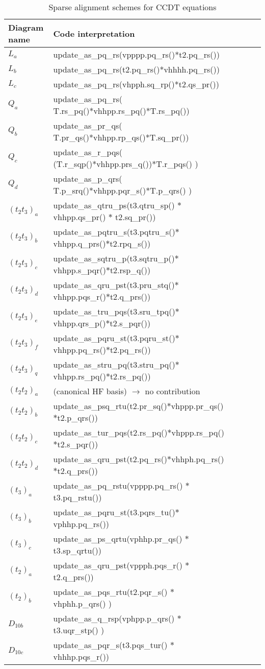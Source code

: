 \begin{table}[]
\centering
\caption{Sparse alignment schemes for CCDT equations}
\label{tab:diagram_code_interpretation}
\begin{tabular}{llllll}
Diagram name  &Code interpretation \\  \hline 
$L_a$   &  update\_as\_pq\_rs(vpppp.pq\_rs()*t2.pq\_rs()) \\
$L_b$   & update\_as\_pq\_rs(t2.pq\_rs()*vhhhh.pq\_rs()) \\
$L_c$   & update\_as\_pq\_rs(vhpph.sq\_rp()*t2.qs\_pr()) \\
$Q_a$   & update\_as\_pq\_rs( T.rs\_pq()*vhhpp.rs\_pq()*T.rs\_pq())\\
$Q_b$   &update\_as\_pr\_qs( T.pr\_qs()*vhhpp.rp\_qs()*T.sq\_pr())\\
$Q_c$   &update\_as\_r\_pqs( (T.r\_sqp()*vhhpp.prs\_q())*T.r\_pqs() )\\
$Q_d$   & update\_as\_p\_qrs( T.p\_srq()*vhhpp.pqr\_s()*T.p\_qrs() )\\
$(t_2 t_3)_a $&update\_as\_qtru\_ps(t3.qtru\_sp() $*$ vhhpp.qs\_pr() $*$ t2.sq\_pr()) \\
$(t_2 t_3)_b $&update\_as\_pqtru\_s(t3.pqtru\_s()$*$vhhpp.q\_prs()$*$t2.rpq\_s()) \\
$(t_2 t_3)_c $&update\_as\_sqtru\_p(t3.sqtru\_p()$*$vhhpp.s\_pqr()$*$t2.rsp\_q())\\
$(t_2 t_3)_d $&update\_as\_qru\_pst(t3.pru\_stq()$*$vhhpp.pqs\_r()$*$t2.q\_prs()) \\
$(t_2 t_3)_e $&update\_as\_tru\_pqs(t3.sru\_tpq()$*$vhhpp.qrs\_p()$*$t2.s\_pqr()) \\
$(t_2 t_3)_f $&update\_as\_pqru\_st(t3.pqru\_st()$*$vhhpp.pq\_rs()$*$t2.pq\_rs()) \\
$(t_2 t_3)_q $&update\_as\_stru\_pq(t3.stru\_pq()$*$vhhpp.rs\_pq()$*$t2.rs\_pq()) \\ \hline
$(t_2 t_2)_a$ & (canonical HF basis) $\rightarrow$ no contribution \\
$(t_2 t_2)_b$&update\_as\_psq\_rtu(t2.pr\_sq()$*$vhppp.pr\_qs()$*$t2.p\_qrs()) \\
$(t_2 t_2)_c$&update\_as\_tur\_pqs(t2.rs\_pq()$*$vhppp.rs\_pq()$*$t2.s\_pqr()) \\
$(t_2 t_2)_d$&update\_as\_qru\_pst(t2.pq\_rs()$*$vhhph.pq\_rs()$*$t2.q\_prs()) \\ \hline
$(t_3)_a$ &update\_as\_pq\_rstu(vpppp.pq\_rs() $*$ t3.pq\_rstu()) \\
$(t_3)_b$&update\_as\_pqru\_st(t3.pqrs\_tu()$*$ vphhp.pq\_rs()) \\
$(t_3)_c$&update\_as\_ps\_qrtu(vphhp.pr\_qs() $*$ t3.sp\_qrtu()) \\ \hline
$(t_2)_a$&update\_as\_qru\_pst(vppph.pqs\_r() $*$ t2.q\_prs()) \\
$(t_2)_b$&update\_as\_pqs\_rtu(t2.pqr\_s() $*$ vhphh.p\_qrs() ) \\ \hline
$D_{10b}$&update\_as\_q\_rsp(vphpp.p\_qrs() $*$ t3.uqr\_stp() ) \\
$D_{10c}$&update\_as\_pqr\_s(t3.pqs\_tur() $*$ vhhhp.pqs\_r()) \\ \hline
\end{tabular}
\end{table}


